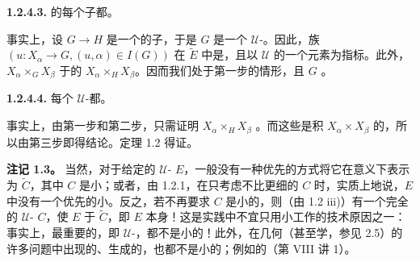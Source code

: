 \textbf{1.2.4.3.} 的每个子都。

事实上，设 $G\to H$ 是一个的子，于是 $G$ 是一个 $\mathcal U$-。因此，族 $(u:X_\alpha\to G,(u,\alpha)\in I(G))$ 在 $\widetilde E$ 中是，且以 $\mathcal U$ 的一个元素为指标。此外， $X_\alpha\times_G X_\beta$ 于的 $X_\alpha\times_H X_\beta$。因而我们处于第一步的情形，且 $G$ 。

\textbf{1.2.4.4.} 每个 $\mathcal U$-都。

事实上，由第一步和第二步，只需证明 $X_\alpha\times_H X_\beta$ 。而这些是积 $X_\alpha\times X_\beta$ 的，所以由第三步即得结论。定理 1.2 得证。

\textbf{注记 1.3。} 当然，对于给定的 $\mathcal U$- $E$，一般没有一种优先的方式将它在意义下表示为 $\widetilde C$，其中 $C$ 是小；或者，由 1.2.1，在只考虑不比更细的 $C$ 时，实质上地说，$E$ 中没有一个优先的小。反之，若不再要求 $C$ 是小的，则（由 1.2 iii)）有一个完全的 $\mathcal U$- $C$，使 $E$ 于 $\widetilde C$，即 $E$ 本身！这是实践中不宜只用小工作的技术原因之一：事实上，最重要的，即 $\mathcal U$-，都不是小的！此外，在几何（甚至学，参见 2.5）的许多问题中出现的、生成的，也都不是小的；例如的（第 VIII 讲 1）。

